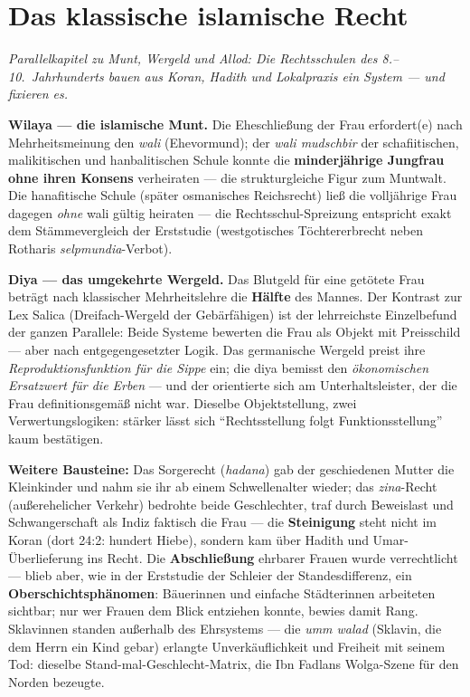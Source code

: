 \documentclass[11pt,a4paper,ngerman]{scrartcl}
\newcommand{\chipbase}[2]{\hspace{0pt}{\footnotesize\textcolor{#1}{[\textsc{#2}]}}}
\newcommand{\chipbelegt}[1]{\chipbase{chipgreen}{#1}}
\newcommand{\chipplausibel}[1]{\chipbase{chipamber}{#1}}
\begin{document}
\section{Das klassische islamische Recht}
\noindent\textit{Parallelkapitel zu Munt, Wergeld und Allod: Die Rechtsschulen des 8.--10.~Jahrhunderts bauen aus Koran, Hadith und Lokalpraxis ein System --- und fixieren es.}
\medskip

\textbf{Wilaya --- die islamische Munt.} Die Eheschließung der Frau erfordert(e) nach Mehrheitsmeinung den \emph{wali} (Ehevormund); der \emph{wali mudschbir} der schafiitischen, malikitischen und hanbalitischen Schule konnte die \textbf{minderjährige Jungfrau ohne ihren Konsens} verheiraten --- die strukturgleiche Figur zum Muntwalt. Die hanafitische Schule (später osmanisches Reichsrecht) ließ die volljährige Frau dagegen \emph{ohne} wali gültig heiraten --- die Rechtsschul-Spreizung entspricht exakt dem Stämmevergleich der Erststudie (westgotisches Töchtererbrecht neben Rotharis \emph{selpmundia}-Verbot). \chipbelegt{belegt}

\textbf{Diya --- das umgekehrte Wergeld.} Das Blutgeld für eine getötete Frau beträgt nach klassischer Mehrheitslehre die \textbf{Hälfte} des Mannes. Der Kontrast zur Lex Salica (Dreifach-Wergeld der Gebärfähigen) ist der lehrreichste Einzelbefund der ganzen Parallele: Beide Systeme bewerten die Frau als Objekt mit Preisschild --- aber nach entgegengesetzter Logik. Das germanische Wergeld preist ihre \emph{Reproduktionsfunktion für die Sippe} ein; die diya bemisst den \emph{ökonomischen Ersatzwert für die Erben} --- und der orientierte sich am Unterhaltsleister, der die Frau definitionsgemäß nicht war. Dieselbe Objektstellung, zwei Verwertungslogiken: stärker lässt sich \enquote{Rechtsstellung folgt Funktionsstellung} kaum bestätigen. \chipplausibel{plausibel}

\textbf{Weitere Bausteine:} Das Sorgerecht (\emph{hadana}) gab der geschiedenen Mutter die Kleinkinder und nahm sie ihr ab einem Schwellenalter wieder; das \emph{zina}-Recht (außerehelicher Verkehr) bedrohte beide Geschlechter, traf durch Beweislast und Schwangerschaft als Indiz faktisch die Frau --- die \textbf{Steinigung} steht nicht im Koran (dort 24:2: hundert Hiebe), sondern kam über Hadith und Umar-Überlieferung ins Recht. Die \textbf{Abschließung} ehrbarer Frauen wurde verrechtlicht --- blieb aber, wie in der Erststudie der Schleier der Standesdifferenz, ein \textbf{Oberschichtsphänomen}: Bäuerinnen und einfache Städterinnen arbeiteten sichtbar; nur wer Frauen dem Blick entziehen konnte, bewies damit Rang. \chipbelegt{belegt} Sklavinnen standen außerhalb des Ehrsystems --- die \emph{umm walad} (Sklavin, die dem Herrn ein Kind gebar) erlangte Unverkäuflichkeit und Freiheit mit seinem Tod: dieselbe Stand-mal-Geschlecht-Matrix, die Ibn Fadlans Wolga-Szene für den Norden bezeugte. \chipbelegt{belegt}
\end{document}
